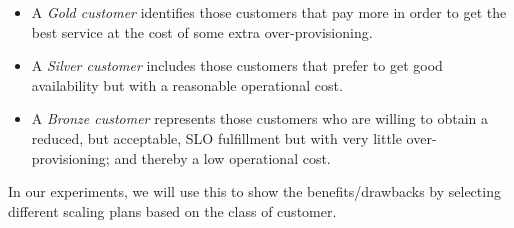 \begin{itemize}
\item A \emph{Gold customer} identifies those customers that pay more in order to get the best service at the cost of some extra over-provisioning. 
\item A \emph{Silver customer} includes those customers that prefer to get good availability but with a reasonable operational cost.
\item A  \emph{Bronze customer} represents those customers who are willing to obtain a reduced, but acceptable, SLO fulfillment but with very little over-provisioning; and thereby a low operational cost. 

\end{itemize}

In our experiments, we will use this  to show the benefits/drawbacks by selecting different scaling plans based on the class of customer.






